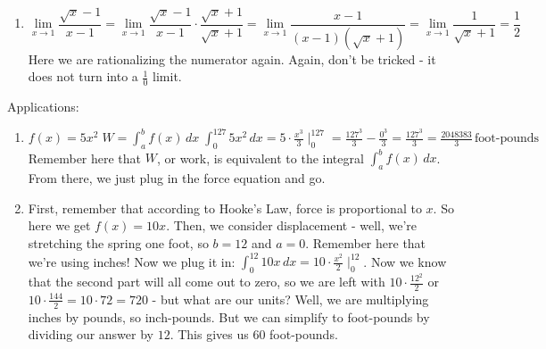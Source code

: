 \documentclass[12pt]{article}
\begin{document}
\begin{enumerate}
\item \begin{equation*}
    \lim\limits_{x\rightarrow 1} \frac{\sqrt{x}-1}{x-1} = \lim\limits_{x\rightarrow 1} \frac{\sqrt{x}-1}{x-1} \cdot \frac{\sqrt{x}+1}{\sqrt{x}+1} = \lim\limits_{x\rightarrow 1} \frac{x-1}{(x-1)(\sqrt{x}+1)}=\lim\limits_{x\rightarrow 1} \frac{1}{\sqrt{x}+1} = \frac{1}{2}
\end{equation*}
Here we are rationalizing the numerator again. Again, don't be tricked - it does not turn into a $\frac{1}{0}$ limit.
\end{enumerate}

Applications:
\begin{enumerate}
\item $f(x) = 5x^2 \; W = \int^b_a f(x) \, dx \; \int^127_0 5x^2 \, dx = 5\cdot \frac{x^3}{3}\mid^{127}_0 = \frac{127^3}{3}-\frac{0^3}{3} = \frac{127^3}{3} = \frac{2048383}{3} \,\text{foot-pounds}$
Remember here that $W$, or work, is equivalent to the integral $\int^b_a f(x) \, dx$. From there, we just plug in the force equation and go.
\item First, remember that according to Hooke's Law, force is proportional to $x$. So here we get $f(x) = 10x$. Then, we consider displacement - well, we're stretching the spring one foot, so $b=12$ and $a = 0$. Remember here that we're using inches! Now we plug it in: $\int^{12}_0 10x \, dx = 10\cdot\frac{x^2}{2}\mid^{12}_0$. Now we know that the second part will all come out to zero, so we are left with $10\cdot\frac{12^2}{2}$ or $10\cdot\frac{144}{2} = 10\cdot 72 = 720$ - but what are our units? Well, we are multiplying inches by pounds, so inch-pounds. But we can simplify to foot-pounds by dividing our answer by $12$. This gives us $60$ foot-pounds.
\end{enumerate}
\end{document}
